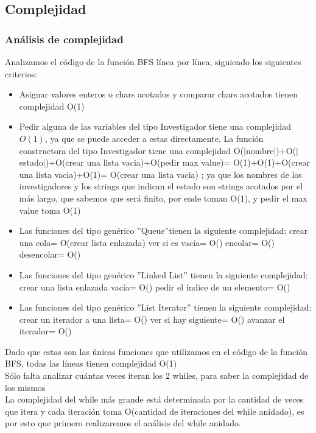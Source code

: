 \subsection{Complejidad}
\subsubsection{Análisis de complejidad}
\indent Analizamos el código de la función BFS línea por línea, siguiendo los
siguientes criterios:
\begin{itemize}
 \item Asignar valores enteros o chars acotados y comparar chars acotados
 tienen complejidad O(1)
 \item Pedir alguna de las variables del tipo Investigador tiene una complejidad
$O(1)$, 
 ya que se puede acceder a estas directamente.
 \subitem La función constructora del tipo Investigador tiene una complejidad 
 O($|$nombre$|$)+O($|$estado$|$)+O(crear una lista vacia)+O(pedir max value)=
 O(1)+O(1)+O(crear una lista vacia)+O(1)= O(crear una lista vacia) ;
 ya que los nombres de los investigadores y los strings que indican el estado
 son strings acotados por el más largo, que sabemos que será finito, por ende toman O(1), y
 pedir el max value toma O(1)
 \item Las funciones del tipo genérico ''Queue''tienen la siguiente complejidad:
 \subitem crear una cola= O(crear lista enlazada)
 \subitem ver si es vacía= O()
 \subitem encolar= O()
 \subitem desencolar= O()
 \item Las funciones del tipo genérico ''Linked List'' tienen
 la siguiente complejidad:
 \subitem crear una lista enlazada vacía= O()
 \subitem pedir el índice de un elemento= O()
 \item  Las funciones del tipo genérico ''List Iterator'' tienen
 la siguiente complejidad:
 \subitem crear un iterador a una lista= O()
 \subitem ver si hay siguiente= O()
 \subitem avanzar el iterador= O()
 
\end{itemize}

\indent Dado que estas son las únicas funciones que utilizamos en el código de
la función BFS, todas las líneas tienen complejidad O(1)\\
\indent Sólo falta analizar cuántas veces iteran los 2 whiles, para saber la 
complejidad de los mismos\\

\indent La complejidad del while más grande está determinada por la cantidad de veces que itera 
y cada iteración toma O(cantidad de iteraciones del while anidado), es por esto que
primero realizaremos el análisis del while anidado.\\

